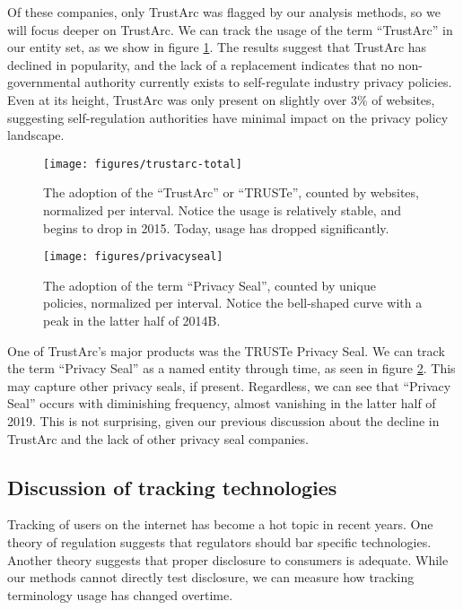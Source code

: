 Of these companies, only TrustArc was flagged by our analysis methods, so we will focus deeper on TrustArc. We can track the usage of the term ``TrustArc'' in our entity set, as we show in figure \ref{fig:trustarc}.  The results suggest that TrustArc has declined in popularity, and the lack of a replacement indicates that no non-governmental authority currently exists to self-regulate industry privacy policies. Even at its height, TrustArc was only present on slightly over 3\% of websites, suggesting self-regulation authorities have minimal impact on the privacy policy landscape.

\begin{figure}
    \centering
    \texttt{[image: figures/trustarc-total]}
    \caption{The adoption of the ``TrustArc'' or ``TRUSTe'', counted by websites, normalized per interval. Notice the usage is relatively stable, and begins to drop in 2015. Today, usage has dropped significantly.} %
    \label{fig:trustarc}
\end{figure}

\begin{figure}
    \centering
    \texttt{[image: figures/privacyseal]}
    \caption{The adoption of the term ``Privacy Seal'', counted by unique policies, normalized per interval. Notice the bell-shaped curve with a peak in the latter half of 2014B.} %
    \label{fig:privacyseal}
\end{figure}

One of TrustArc's major products was the TRUSTe Privacy Seal. We can track the term ``Privacy Seal'' as a named entity through time, as seen in figure \ref{fig:privacyseal}. This may capture other privacy seals, if present. Regardless, we can see that ``Privacy Seal'' occurs with diminishing frequency, almost vanishing in the latter half of 2019. This is not surprising, given our previous discussion about the decline in TrustArc and the lack of other privacy seal companies. 

\subsection{Discussion of tracking technologies}
Tracking of users on the internet has become a hot topic in recent years. One theory of regulation suggests that regulators should bar specific technologies. Another theory suggests that proper disclosure to consumers is adequate. While our methods cannot directly test disclosure, we can measure how tracking terminology usage has changed overtime.

